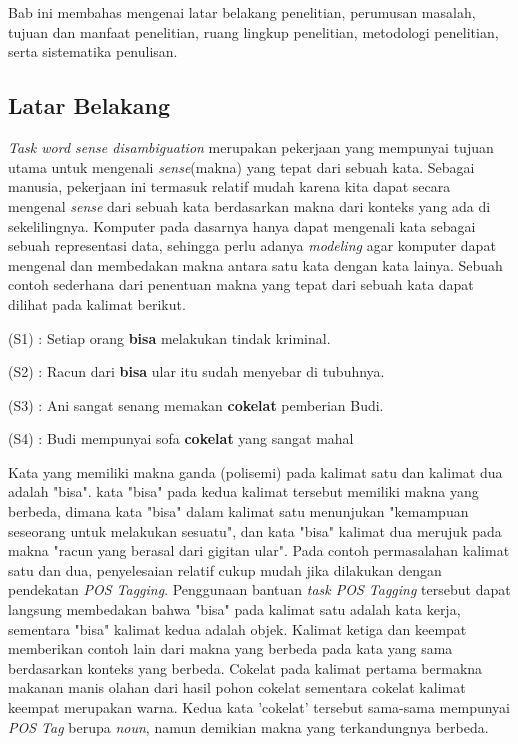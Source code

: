 \chapter{\babSatu}
Bab ini membahas mengenai latar belakang penelitian, perumusan masalah, tujuan dan manfaat penelitian, ruang lingkup penelitian, metodologi penelitian, serta sistematika penulisan.

\section{Latar Belakang}

\textit{Task word sense disambiguation} merupakan pekerjaan yang mempunyai tujuan utama untuk mengenali \textit{sense}(makna) yang tepat dari sebuah kata. Sebagai manusia, pekerjaan ini termasuk relatif mudah karena kita dapat secara mengenal \textit{sense} dari sebuah kata berdasarkan makna dari konteks yang ada di sekelilingnya. Komputer pada dasarnya hanya dapat mengenali kata sebagai sebuah representasi data, sehingga perlu adanya \textit{modeling} agar komputer dapat mengenal dan membedakan makna antara satu kata dengan kata lainya. Sebuah contoh sederhana dari penentuan makna yang tepat dari sebuah kata dapat dilihat pada kalimat berikut.

(S1) : Setiap orang \textbf{bisa} melakukan tindak kriminal.

(S2) : Racun dari \textbf{bisa} ular itu sudah menyebar di tubuhnya.

(S3) : Ani sangat senang memakan \textbf{cokelat} pemberian Budi.

(S4) : Budi mempunyai sofa \textbf{cokelat} yang sangat mahal

Kata yang memiliki makna ganda (polisemi) pada kalimat satu dan kalimat dua adalah "bisa". kata "bisa" pada kedua kalimat tersebut memiliki makna yang berbeda, dimana kata "bisa" dalam kalimat satu menunjukan "kemampuan seseorang untuk melakukan sesuatu", dan kata "bisa" kalimat dua merujuk pada makna "racun yang berasal dari gigitan ular". Pada contoh permasalahan kalimat satu dan dua, penyelesaian relatif cukup mudah jika dilakukan dengan pendekatan \textit{POS Tagging}. Penggunaan bantuan \textit{task POS Tagging} tersebut dapat langsung membedakan bahwa "bisa" pada kalimat satu adalah kata kerja, sementara "bisa" kalimat kedua adalah objek. Kalimat ketiga dan keempat memberikan contoh lain dari makna yang berbeda pada kata yang sama berdasarkan konteks yang berbeda. Cokelat pada kalimat pertama bermakna makanan manis olahan dari hasil pohon cokelat sementara cokelat kalimat keempat merupakan warna. Kedua kata 'cokelat' tersebut sama-sama mempunyai \textit{POS Tag} berupa \textit{noun}, namun demikian makna yang terkandungnya berbeda.


